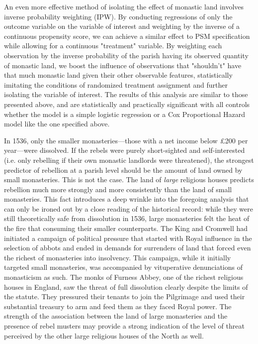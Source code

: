 \documentclass[12pt]{article}
\begin{document}


An even more effective method of isolating the effect of monastic land involves inverse probability weighting (IPW). By conducting regressions of only the outcome variable on the variable of interest and weighting by the inverse of a continuous propensity score, we can achieve a similar effect to PSM specification while allowing for a continuous "treatment" variable. By weighting each observation by the inverse probability of the parish having its observed quantity of monastic land, we boost the influence of observations that "shouldn't" have that much monastic land given their other observable features, statistically imitating the conditions of randomized treatment assignment and further isolating the variable of interest. The results of this analysis are similar to those presented above, and are statistically and practically significant with all controls whether the model is a simple logistic regression or a Cox Proportional Hazard model like the one specified above.



In 1536, only the smaller monasteries---those with a net income below \pounds200 per year---were dissolved. If the rebels were purely short-sighted and self-interested (i.e. only rebelling if their own monastic landlords were threatened), the strongest predictor of rebellion at a parish level should be the amount of land owned by small monasteries. This is not the case. The land of \emph{large} religious houses predicts rebellion much more strongly and more consistently than the land of small monasteries. This fact introduces a deep wrinkle into the foregoing analysis that can only be ironed out by a close reading of the historical record: while they were still theoretically safe from dissolution in 1536, large monasteries felt the heat of the fire that consuming their smaller counterparts. The King and Cromwell had initiated a campaign of political pressure that started with Royal influence in the selection of abbots and ended in demands for surrenders of land that forced even the richest of monasteries into insolvency. This campaign, while it initially targeted small monasteries, was accompanied by vituperative denunciations of monasticism as such. The monks of Furness Abbey, one of the richest religious houses in England, saw the threat of full dissolution clearly despite the limits of the statute. They pressured their tenants to join the Pilgrimage and used their substantial treasury to arm and feed them as they faced Royal power. The strength of the association between the land of large monasteries and the presence of rebel musters may provide a strong indication of the level of threat perceived by the other large religious houses of the North as well.
\end{document}
